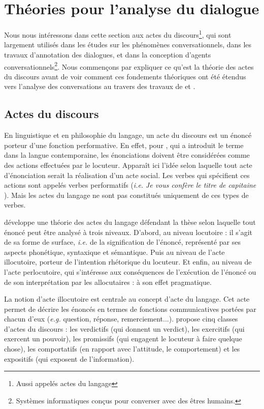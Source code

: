 \documentclass[10pt,a4paper,twoside]{article}
\begin{document}
\section{Théories pour l'analyse du dialogue}
\label{sec:dialog_analysis_theories}

Nous nous intéressons dans cette section aux actes du discours\footnote{Aussi appelés \og actes du langage \fg}, qui sont largement utilisés dans les études sur les phénomènes conversationnels, dans les travaux d'annotation des dialogues, et dans la conception d'agents conversationnels\footnote{Systèmes informatiques conçus pour converser avec des êtres humains.}. Nous commençons par expliquer ce qu'est la théorie des actes du discours avant de voir comment ces fondements théoriques ont été étendus vers l'analyse des conversations au travers des travaux de \citet{traum1992conversation} et \citet{poesio1997conversational}.

\subsection{Actes du discours}
\label{subsec:speech_acts}

En linguistique et en philosophie du langage, un acte du discours est un énoncé porteur d'une fonction performative. En effet, pour \citeauthor{austin1975how}, qui a introduit le terme dans la langue contemporaine, les énonciations doivent être considérées comme des actions effectuées par le locuteur. Apparaît ici l’idée selon laquelle tout acte d’énonciation serait la réalisation d’un acte social. Les verbes qui spécifient ces actions sont appelés verbes performatifs (\textit{i.e.} \textit{\og Je vous confère le titre de capitaine \fg}). Mais les actes du langage ne sont pas constitués uniquement de ces types de verbes. 

\citet{austin1975how} développe une théorie des actes du langage défendant la thèse selon laquelle tout énoncé peut être analysé à trois niveaux. D'abord, au niveau locutoire : il s'agit de sa forme de surface, \textit{i.e.} de la signification de l'énoncé, représenté par ses aspects phonétique, syntaxique et sémantique. Puis au niveau de l'acte illocutoire, porteur de l'intention rhétorique du locuteur. Et enfin, au niveau de l'acte perlocutoire, qui s'intéresse aux conséquences de l'exécution de l'énoncé ou de son interprétation par les allocutaires : à son effet pragmatique.

La notion d'acte illocutoire est centrale au concept d'acte du langage. Cet acte permet de décrire les énoncés en termes de fonctions communicatives portées par chacun d’eux (\textit{e.g.} question, réponse, remerciement...). \citeauthor{austin1975how} propose cinq classes d'actes du discours : les verdictifs (qui donnent un verdict), les exercitifs (qui exercent un pouvoir), les promissifs (qui engagent le locuteur à faire quelque chose), les comportatifs (en rapport avec l'attitude, le comportement) et les expositifs (qui exposent de l'information). 
\end{document}
